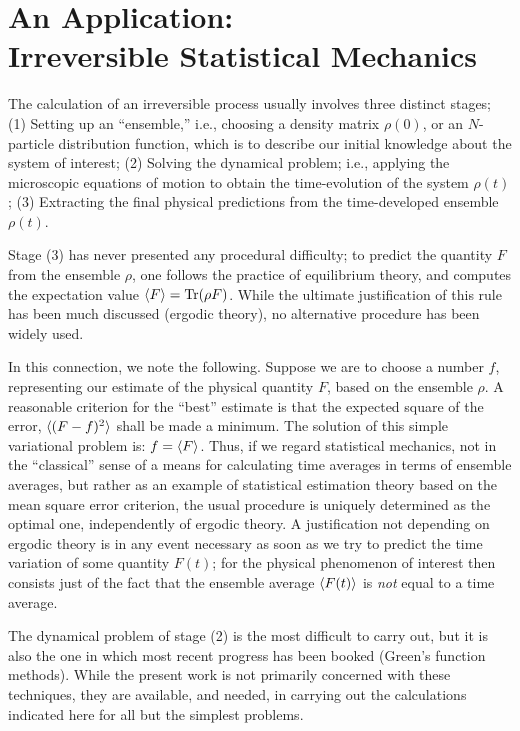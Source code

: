 \section{An Application: \texorpdfstring{\\}{}Irreversible Statistical Mechanics}
\label{sec:D}
The calculation of an irreversible process usually involves three distinct stages;
(1) Setting up an ``ensemble,'' i.e., choosing a density matrix $\rho(0)$, or an $N$-particle distribution function, which is to describe our initial knowledge about the system of interest;
(2) Solving the dynamical problem; i.e., applying the microscopic equations of motion to obtain the time-evolution of the system $\rho(t)$;
(3) Extracting the final physical predictions from the time-developed ensemble $\rho(t)$.

Stage (3) has never presented any procedural difficulty; to predict the quantity $F$ from the ensemble $\rho$, one follows the practice of equilibrium theory, and computes the expectation value $\langle F\rangle = \operatorname{Tr}(\rho F)$.
While the ultimate justification of this rule has been much discussed (ergodic theory), no alternative procedure has been widely used.

In this connection, we note the following.
Suppose we are to choose a number $f$, representing our estimate of the physical quantity $F$, based on the ensemble $\rho$.
A reasonable criterion for the ``best'' estimate is that the expected square of the error, $\langle(F-f)^2\rangle$ shall be made a minimum.
The solution of this simple variational problem is: $f = \langle F\rangle$.
Thus, if we regard statistical mechanics, not in the ``classical'' sense of a means for calculating time averages in terms of ensemble averages, but rather as an example of statistical estimation theory based on the mean square error criterion, the usual procedure is uniquely determined as the optimal one, independently of ergodic theory.
A justification not depending on ergodic theory is in any event necessary as soon as we try to predict the time variation of some quantity $F(t)$; for the physical phenomenon of interest then consists just of the fact that the ensemble average $\langle F(t)\rangle$ is \emph{not} equal to a time average.

The dynamical problem of stage (2) is the most difficult to carry out, but it is also the one in which most recent progress has been booked (Green's function methods).
While the present work is not primarily concerned with these techniques, they are available, and needed, in carrying out the calculations indicated here for all but the simplest problems.

